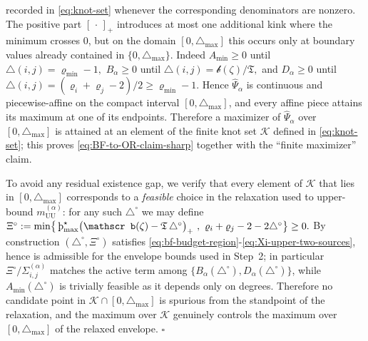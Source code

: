 \documentclass[twoside,11pt]{article}
\numberwithin{equation}{section}
\numberwithin{theorem}{section}
\numberwithin{example}{section}
\newcommand{\sho}{\textup{\text{\th}}}
\begin{document}
recorded in \eqref{eq:knot-set} whenever the corresponding denominators are nonzero. The positive part $[\,\cdot\,]_+$ introduces at most one additional kink where the minimum crosses $0$, but on the domain $[0,\triangle_{\max}]$ this occurs only at boundary values already contained in $\{0,\triangle_{\max}\}$. Indeed $A_{\min}\ge 0$ until 
\(
\triangle(i,j)=\varrho_{\min}-1,
\)
$B_\alpha\ge 0$ until 
\(
\triangle(i,j)={\mathscr b(\zeta)}/{\mathfrak T},
\)
and $D_\alpha\ge 0$ until 
\(\triangle(i,j)={(\varrho_i+\varrho_j-2)}/{2}\ge \varrho_{\min}-1.
\)
Hence $\widehat\Psi_\alpha$ is continuous and piecewise-affine on the compact interval $[0,\triangle_{\max}]$, and every affine piece attains its maximum at one of its endpoints. Therefore a maximizer of $\widehat\Psi_\alpha$ over $[0,\triangle_{\max}]$ is attained at an element of the finite knot set $\mathcal K$ defined in \eqref{eq:knot-set}; this proves \eqref{eq:BF-to-OR-claim-sharp} together with the ``finite maximizer'' claim.

\noindent
To avoid any residual existence gap, we verify that every element of $\mathcal K$ that lies in $[0,\triangle_{\max}]$ corresponds to a \emph{feasible} choice in the relaxation used to upper-bound $m^{(\alpha)}_{\mathrm{UU}}$:
for any such $\triangle^\circ$ we may define
\(
\Xi^\circ := \min\bigl\{\,\sho_{\max}^\star\bigl(\mathscr b(\zeta)-\mathfrak T\,\triangle^\circ\bigr)_+\ ,\ \varrho_i+\varrho_j-2-2\triangle^\circ \bigr\} \ge 0.
\)
By construction $(\triangle^\circ,\Xi^\circ)$ satisfies \eqref{eq:bf-budget-region}-\eqref{eq:Xi-upper-two-sources}, hence is admissible for the envelope bounds used in Step~2; in particular $\Xi^\circ/\Sigma^{(\alpha)}_{i,j}$ matches the active term among $\{B_\alpha(\triangle^\circ),D_\alpha(\triangle^\circ)\}$, while $A_{\min}(\triangle^\circ)$ is trivially feasible as it depends only on degrees.
Therefore no candidate point in $\mathcal K\cap[0,\triangle_{\max}]$ is spurious from the standpoint of the relaxation, and the maximum over $\mathcal K$ genuinely controls the maximum over $[0,\triangle_{\max}]$ of the relaxed envelope.
\hfill $\square$
\end{document}
